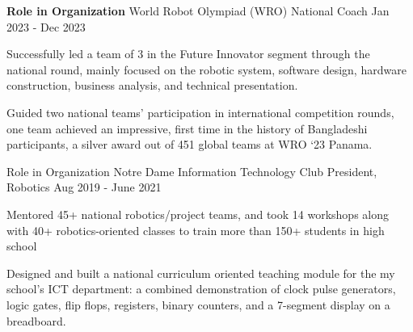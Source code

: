 

\begin{cventries}

  \cventryalt
    {\textbf{Role in Organization}} %
    {World Robot Olympiad (WRO)} %
    {National Coach} %
    {Jan 2023 - Dec 2023} %
    {
      \begin{cvitems} %
        \item {Successfully led a team of 3 in the Future Innovator segment through the national round, mainly focused on the robotic system, software design, hardware construction, business analysis, and technical presentation.}
        \item {Guided two national teams' participation in international competition rounds, one team achieved an impressive, first time in the history of Bangladeshi participants, a silver award out of 451 global teams at WRO ‘23 Panama.}
      \end{cvitems}
    }

  \cventryalt
    {Role in Organization} %
    { Notre Dame Information Technology Club} %
    {President, Robotics} %
    {Aug 2019 - June 2021} %
    {
      \begin{cvitems} %
        \item {Mentored 45+ national robotics/project teams, and took 14 workshops along with 40+ robotics-oriented classes to train more than 150+ students in high school}
        \item {Designed and built a national curriculum oriented teaching module for the my school's ICT department: 
        a combined demonstration of clock pulse generators, logic gates, flip flops, registers, binary counters, and a 7-segment display on a breadboard.}
      \end{cvitems}
    }

\end{cventries}

